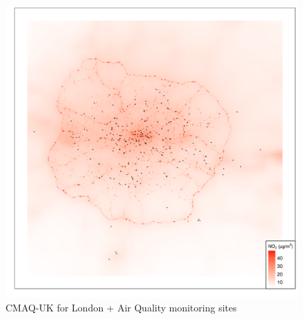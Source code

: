 \begin{figure}[H]
\centering
\includegraphics[scale=0.5]{images/cmaq_and_monitoring_sites.png}
\caption{CMAQ-UK for London + Air Quality monitoring sites}
\label{fig:cmaq_and_monitoring_sites}
\end{figure}

